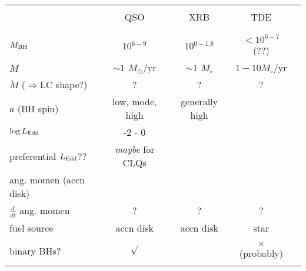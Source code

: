 \documentclass[11pt]{article}
\begin{document}
\clearpage
\LARGE
\begin{table}
    \begin{center}
      \begin{tabular}{lcccr} 
        \hline
        \hline 
                                            & & & \\
                                               & QSO                                & XRB                                  & TDE                \\
                                            & & & \\
        \hline 
                                            & & & \\
$M_{\rm BH}$                            & 10$^{6-9}$                       &  10$^{0-1.8}$                    &  $<10^{6-7}$(??)           \\ 
$\dot{M}$                               &  $\sim1$ $M_{\odot}$/yr      &    $\sim1$ $M_{\circ}$       & $1-10 M_{\circ}$/yr   \\
$\ddot{M}$ ($\Rightarrow$LC shape?)          &  ?                                    &    ?                                    & ? \\
$a$ (BH spin)                         & low, mode, high              & generally high                  &  \\
$\log L_{\rm Edd}$                    & -2 - 0                             & & \\
preferential $L_{\rm Edd}$??       & {\it maybe} for CLQs              & & \\
ang. momen (accn disk)                   &                                       &                                   & \\           
$\frac{d}{dt}$ ang. momen      &    ?                                   &      ?                             & ? \\           
fuel source                              & accn disk & accn disk & star \\ 
                                            & & & \\
binary BHs?                           & $\surd$                         &                                        & $\times$ (probably)  \\
                                            & & & \\

\end{tabular}
\end{center}
\end{table}
\end{document}

